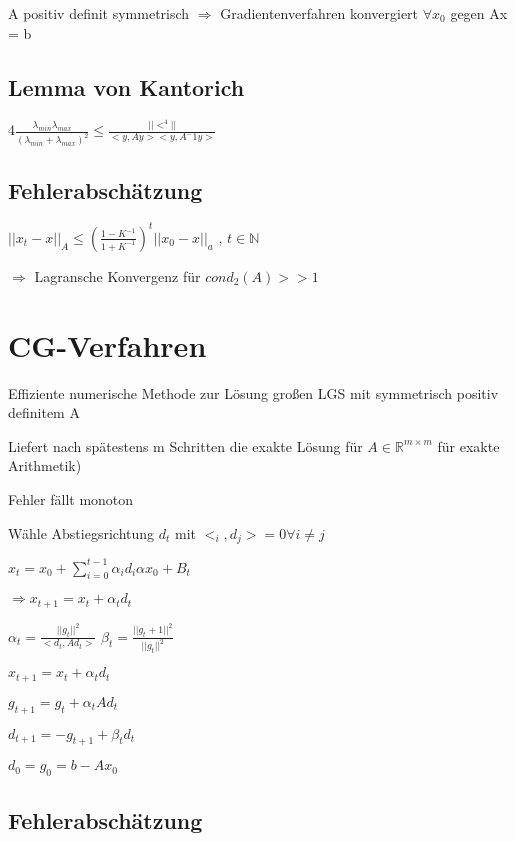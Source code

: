 \documentclass[12pt,a4paper]{article} %
\newcommand*\tab[1][1cm]{\hspace*{#1}}
\begin{document}
	A positiv definit symmetrisch $\Rightarrow$ Gradientenverfahren konvergiert $\forall x_0$ gegen Ax = b
	
	\subsection{Lemma von Kantorich}
	
	$ 4 \frac{\lambda_{min} \lambda_{max}}{(\lambda_{min} + \lambda_{max})^2} \le \frac{||<^4||}{<y, Ay><y, A^-1y>}$
	
	\subsection{Fehlerabschätzung}
	
	$||x_t - x||_A \le (\frac{1 - K^{-1}}{1 + K^{-1}})^t ||x_0 - x||_a$ \tab , $t \in \mathbb{N}$
	
	$\Rightarrow$ Lagransche Konvergenz für $cond_2(A) >> 1$
	
	\newpage
	
	\section{CG-Verfahren}
	
	Effiziente numerische Methode zur Lösung großen LGS mit symmetrisch positiv definitem A
	
	Liefert nach spätestens m Schritten die exakte Lösung für $A \in \mathbb{R}^{m \times m}$ für exakte Arithmetik)
	
	Fehler fällt monoton
	
	Wähle Abstiegsrichtung $d_t$ mit $<_i, d_j> = 0 \forall i \ne j$
	
	$x_t = x_0 + \sum\limits_{i = 0}^{t - 1}\alpha_i d_i \alpha x_0 + B_t$
	
	$\Rightarrow x_{t + 1} = x_t + \alpha_t d_t$
	
	$\alpha_t = \frac{||g_t||^2}{<d_t, Ad_t>}$ \tab $\beta_t = \frac{||g_t + 1||^2}{||g_t||^2}$
	
	$x_{t + 1} = x_t + \alpha_t d_t$
	
	$g_{t + 1} = g_t + \alpha_t Ad_t$
	
	$d_{t + 1} = -g_{t + 1} + \beta_t d_t$
	
	$d_0 = g_0 = b - Ax_0$
	
	\subsection{Fehlerabschätzung}
	
\end{document}
